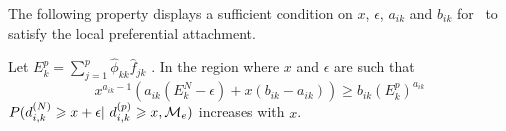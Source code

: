 The following property displays a sufficient condition on $x$, $\epsilon$, $a_{ik}$ and $b_{ik}$ for \imb\ to satisfy the local preferential attachment.

\begin{proposition}\label{prop:IMBlocal}
Let $E_k^p = \sum_{j=1}^p \hat\phi_{kk} \hat{f}_{jk}$ . In the region where $x$ and $\epsilon$ are such that
\begin{equation*}
x^{a_{ik}-1}\left(a_{ik}(E_k^N-\epsilon) + x(b_{ik} - a_{ik}) \right) \geq b_{ik}(E_k^p)^{a_{ik}}
\end{equation*}
$P(d_{i,k}^{(N)} \geq x+\epsilon | d_{i,k}^{(p)} \geq x,\M_e)$ increases with $x$.
\end{proposition}


